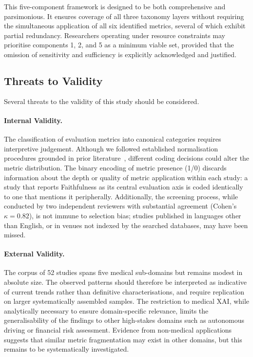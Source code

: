 This five-component framework is designed to be both comprehensive and
parsimonious. It ensures coverage of all three taxonomy layers without
requiring the simultaneous application of all six identified metrics, several
of which exhibit partial redundancy. Researchers operating under resource
constraints may prioritise components 1, 2, and 5 as a minimum viable set,
provided that the omission of sensitivity and sufficiency is explicitly
acknowledged and justified.

\subsection{Threats to Validity}

Several threats to the validity of this study should be considered.

\paragraph{Internal Validity.}
The classification of evaluation metrics into canonical categories requires
interpretive judgement. Although we followed established normalisation
procedures grounded in prior
literature~\cite{rosenfeld2021better,kadir2023evaluation}, different coding
decisions could alter the metric distribution. The binary encoding of metric
presence (1/0) discards information about the depth or quality of metric
application within each study: a study that reports Faithfulness as its
central evaluation axis is coded identically to one that mentions it
peripherally. Additionally, the screening process, while conducted by two
independent reviewers with substantial agreement (Cohen's $\kappa = 0.82$),
is not immune to selection bias; studies published in languages other than
English, or in venues not indexed by the searched databases, may have been
missed.

\paragraph{External Validity.}
The corpus of 52 studies spans five medical sub-domains but remains modest
in absolute size. The observed patterns should therefore be interpreted as
indicative of current trends rather than definitive characterisations, and
require replication on larger systematically assembled samples. The
restriction to medical XAI, while analytically necessary to ensure
domain-specific relevance, limits the generalisability of the findings to
other high-stakes domains such as autonomous driving or financial risk
assessment. Evidence from non-medical
applications~\cite{Ghosh2024DemystifyingEC,Nagy2024ImprovingUM} suggests
that similar metric fragmentation may exist in other domains, but this
remains to be systematically investigated.


